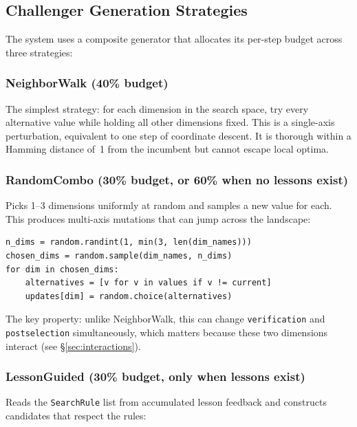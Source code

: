 \documentclass[11pt,a4paper]{article}
\newcommand{\code}[1]{\texttt{#1}}
\begin{document}
\subsection{Challenger Generation Strategies}
\label{sec:strategies}

The system uses a composite generator that allocates its per-step budget
across three strategies:

\subsubsection{NeighborWalk (40\% budget)}

The simplest strategy: for each dimension in the search space, try every
alternative value while holding all other dimensions fixed. This is a
single-axis perturbation, equivalent to one step of coordinate descent. It
is thorough within a Hamming distance of~1 from the incumbent but cannot
escape local optima.

\subsubsection{RandomCombo (30\% budget, or 60\% when no lessons exist)}

Picks 1--3 dimensions uniformly at random and samples a new value for each.
This produces multi-axis mutations that can jump across the landscape:

\begin{lstlisting}[style=python]
n_dims = random.randint(1, min(3, len(dim_names)))
chosen_dims = random.sample(dim_names, n_dims)
for dim in chosen_dims:
    alternatives = [v for v in values if v != current]
    updates[dim] = random.choice(alternatives)
\end{lstlisting}

The key property: unlike NeighborWalk, this can change \code{verification}
and \code{postselection} simultaneously, which matters because these two
dimensions interact (see \S\ref{sec:interactions}).

\subsubsection{LessonGuided (30\% budget, only when lessons exist)}

Reads the \code{SearchRule} list from accumulated lesson feedback and
constructs candidates that respect the rules:
\end{document}
